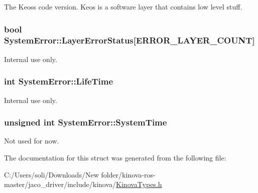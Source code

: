 The Keos\textquotesingle{}s code version. Keos is a software layer that contains low level stuff. 

\subsubsection[{\texorpdfstring{Layer\+Error\+Status}{LayerErrorStatus}}]{\setlength{\rightskip}{0pt plus 5cm}bool System\+Error\+::\+Layer\+Error\+Status\mbox{[}{\bf E\+R\+R\+O\+R\+\_\+\+L\+A\+Y\+E\+R\+\_\+\+C\+O\+U\+NT}\mbox{]}}\hypertarget{struct_system_error_a3e8c91938eb3e65d965d3895b55268b3}{}\label{struct_system_error_a3e8c91938eb3e65d965d3895b55268b3}


Internal use only. 

\subsubsection[{\texorpdfstring{Life\+Time}{LifeTime}}]{\setlength{\rightskip}{0pt plus 5cm}int System\+Error\+::\+Life\+Time}\hypertarget{struct_system_error_ac651a1bd937f272e75a9280d0ea3218d}{}\label{struct_system_error_ac651a1bd937f272e75a9280d0ea3218d}


Internal use only. 

\subsubsection[{\texorpdfstring{System\+Time}{SystemTime}}]{\setlength{\rightskip}{0pt plus 5cm}unsigned int System\+Error\+::\+System\+Time}\hypertarget{struct_system_error_ab6d34bb68ac78bc05dce7803cbb2b5dd}{}\label{struct_system_error_ab6d34bb68ac78bc05dce7803cbb2b5dd}


Not used for now. 



The documentation for this struct was generated from the following file\+:\begin{DoxyCompactItemize}
\item 
C\+:/\+Users/soli/\+Downloads/\+New folder/kinova-\/ros-\/master/jaco\+\_\+driver/include/kinova/\hyperlink{_kinova_types_8h}{Kinova\+Types.\+h}\end{DoxyCompactItemize}
